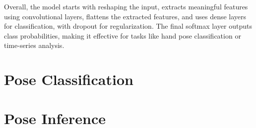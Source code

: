 Overall, the model starts with reshaping the input, extracts meaningful features using convolutional layers, flattens the extracted features, and uses dense layers for classification, with dropout for regularization. The final softmax layer outputs class probabilities, making it effective for tasks like hand pose classification or time-series analysis.
\section{Pose Classification}
\section{Pose Inference}